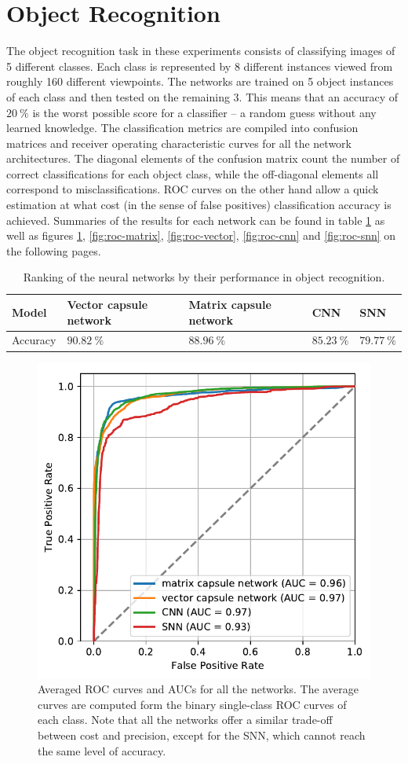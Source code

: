 \section{Object Recognition}
The object recognition task in these experiments consists of classifying images of 5 different classes. Each class is represented by 8 different instances viewed from roughly 160 different viewpoints. The networks are trained on 5 object instances of each class and then tested on the remaining 3. This means that an accuracy of $\SI{20}{\percent}$ is the worst possible score for a classifier -- a random guess without any learned knowledge. The classification metrics are compiled into confusion matrices and receiver operating characteristic curves for all the network architectures. The diagonal elements of the confusion matrix count the number of correct classifications for each object class, while the off-diagonal elements all correspond to misclassifications. ROC curves on the other hand allow a quick estimation at what cost (in the sense of false positives) classification accuracy is achieved. Summaries of the results for each network can be found in table \ref{tab:ranking} as well as figures \ref{fig:all-roc}, \ref{fig:roc-matrix}, \ref{fig:roc-vector}, \ref{fig:roc-cnn} and \ref{fig:roc-snn} on the following pages.
\begin{table}[H]
\centering
\begin{tabular}{@{}lllll@{}}
\toprule
Model    & Vector capsule network & Matrix capsule network & CNN                    & SNN                    \\ \midrule
Accuracy & $\SI{90.82}{\percent}$ & $\SI{88.96}{\percent}$ & $\SI{85.23}{\percent}$ & $\SI{79.77}{\percent}$ \\ \bottomrule
\end{tabular}
\caption[Ranking of the neural networks by their performance in object recognition]{Ranking of the neural networks by their performance in object recognition.}
\label{tab:ranking}
\end{table}\noindent
\begin{figure}[H]
    \centering
\includegraphics[width=.59\textwidth]{figures/all-roc.pdf}
\caption[Averaged ROC curves and AUCs for all the network]{Averaged ROC curves and AUCs for all the networks. The average curves are computed form the binary single-class ROC curves of each class. Note that all the networks offer a similar trade-off between cost and precision, except for the SNN, which cannot reach the same level of accuracy.}\label{fig:all-roc}
\end{figure}\noindent
